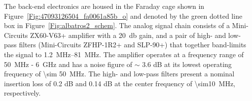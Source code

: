 The back-end electronics are housed in the Faraday cage shown in Figure~\ref{Fig:47093126504_fa0061a85b_o} and denoted by the green dotted line box in Figure~\ref{Fig:albatros2_schem}. The analog signal chain consists of a Mini-Circuits ZX60-V63+ amplifier with a \SI{20}{\decibel} gain, and a pair of high- and low-pass filters (Mini-Circuits ZFHP-1R2+ and SLP-90+) that together band-limits the signal to \SIrange{1.2}{81}{\mega\hertz}. The amplifier operates at a frequency range of \SI{50}{\mega\hertz} - \SI{6}{\giga\hertz} and has a noise figure of $\sim$ 3.6 dB at its lowest operating frequency of \SI{\sim 50}{MHz}. The high- and low-pass filters present a nominal insertion loss of 0.2 dB and 0.14 dB at the center frequency of \SI{\sim10}{MHz}, respectively. 

